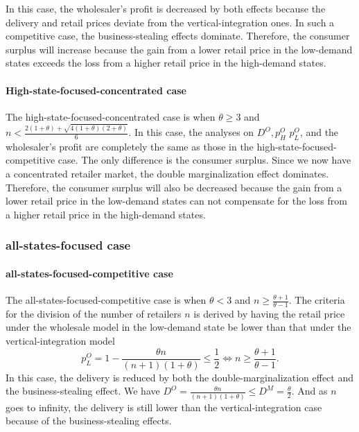 \documentclass[12pt]{article}
\begin{document}
In this case, the wholesaler's profit is decreased by both effects because the delivery and retail prices deviate from the vertical-integration ones. In such a competitive case, the business-stealing effects dominate. Therefore, the consumer surplus will increase because the gain from a lower retail price in the low-demand states exceeds the loss from a higher retail price in the high-demand states.



\paragraph{High-state-focused-concentrated case}
The high-state-focused-concentrated case is when $\theta \geq 3$ and $n < \frac{2(1+\theta) + \sqrt{4(1+\theta)(2 + \theta)}}{6}$. In this case, the analyses on $D^O, p^O_{H}$ $p^O_{L}$, and the wholesaler's profit are completely the same as those in the high-state-focused-competitive case. The only difference is the consumer surplus. Since we now have a concentrated retailer market, the double marginalization effect dominates. Therefore,  the consumer surplus will also be decreased because the gain from a lower retail price in the low-demand states can not compensate for the loss from a higher retail price in the high-demand states.

\subsubsection{all-states-focused case}

\paragraph{all-states-focused-competitive case}
The all-states-focused-competitive case is when $\theta < 3$ and $n \geq \frac{\theta + 1}{\theta - 1}$.  The criteria for the division of the number of retailers $n$ is derived by having the retail price under the wholesale model in the low-demand state be lower than that under the vertical-integration model
\begin{equation}
	p_{L}^O = 1 - \frac{\theta n}{(n + 1)(1+ \theta)} \leq \frac{1}{2} \iff n \geq \frac{\theta + 1}{\theta - 1}.
\end{equation}
In this case, the delivery is reduced by both the double-marginalization effect and the business-stealing effect. We have $D^O = \frac{\theta n}{(n + 1)(1+ \theta)} \leq D^M = \frac{\theta}{2}$. And as $n$ goes to infinity, the delivery is still lower than the vertical-integration case because of the business-stealing effects. 
\end{document}
